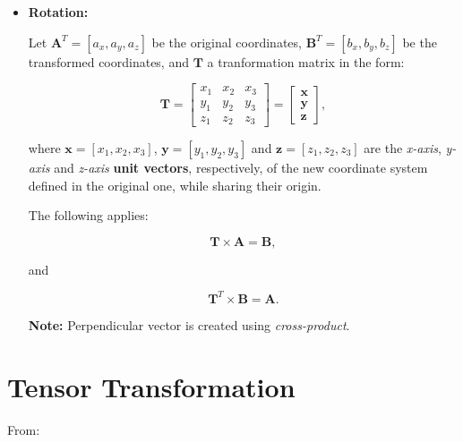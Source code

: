 \begin{itemize}
    \item \textbf{Rotation:}

        Let $\mathbf{A}^{T} = [a_{x}, a_{y}, a_{z}]$ be the original coordinates,
        $\mathbf{B}^{T} = [b_{x}, b_{y}, b_{z}]$ be the transformed coordinates, and
        $\mathbf{T}$ a tranformation matrix in the form:

        \begin{equation}
            \mathbf{T} = \begin{bmatrix}
                x_1 & x_2 & x_3 \\
                y_1 & y_2 & y_3 \\
                z_1 & z_2 & z_3
            \end{bmatrix} = \begin{bmatrix}
                \mathbf{x} \\
                \mathbf{y} \\
                \mathbf{z}
            \end{bmatrix}
        ,\end{equation}

        where $\mathbf{x} = [x_1, x_2, x_3]$, $\mathbf{y} = [y_1, y_2, y_3]$ and
        $\mathbf{z} = [z_1, z_2, z_3]$ are the \textit{x-axis}, \textit{y-axis} and
        \textit{z-axis} \textbf{unit vectors}, respectively, of the new coordinate
        system defined in the original one, while sharing their origin.

        The following applies:

        \begin{equation}
            \mathbf{T} \times \mathbf{A} = \mathbf{B}
        ,\end{equation}

        and

        \begin{equation}
            \mathbf{T}^{T} \times \mathbf{B} = \mathbf{A}
        .\end{equation}

        \textbf{Note:} Perpendicular vector is  created using \textit{cross-product}.
\end{itemize}


\section{Tensor Transformation}

From:

